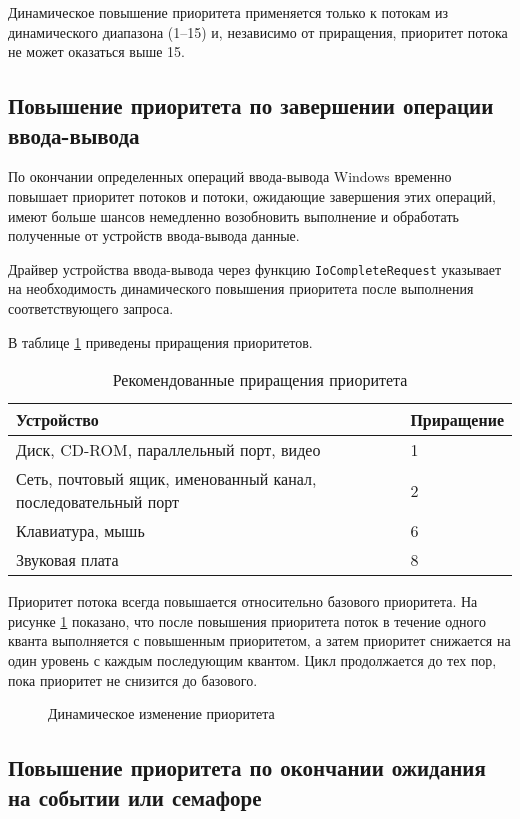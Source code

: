\documentclass[a4paper,oneside,14pt]{extreport}
\newcommand{\img}[3]
{
	\begin{figure}[ht]
	\center{\texttt{[image: images/\#2]}}
	\caption{#3}
	\label{img:#2}
	\end{figure}
}
\newcommand{\code}[1]{\texttt{#1}}
\begin{document}
Динамическое повышение приоритета применяется только к потокам из динамического диапазона (1--15) и, независимо от приращения, приоритет потока не может оказаться выше 15.

\subsection{Повышение приоритета по завершении операции ввода-вывода}

По окончании определенных операций ввода-вывода Windows временно повышает приоритет потоков и потоки, ожидающие завершения этих операций, имеют больше шансов немедленно возобновить выполнение и обработать полученные от устройств ввода-вывода данные.

Драйвер устройства ввода-вывода через функцию \code{IoCompleteRequest} указывает на необходимость динамического повышения приоритета после выполнения соответствующего запроса.

В таблице \ref{tbl:priorityinc} приведены приращения приоритетов.

\begin{table}
\begin{center}
\begin{tabular}{|p{100mm}|l|} 
	\hline
	Устройство & Приращение \\	
	\hline
	Диск, CD-ROM, параллельный порт, видео & 1 \\
	\hline
	Сеть, почтовый ящик, именованный канал, последовательный порт & 2 \\
	\hline
	Клавиатура, мышь & 6 \\
	\hline
	Звуковая плата & 8 \\
	\hline
\end{tabular}
\end{center}
\caption{Рекомендованные приращения приоритета}
\label{tbl:priorityinc}
\end{table}

Приоритет потока всегда повышается относительно базового приоритета. На рисунке \ref{img:priority} показано, что после повышения приоритета поток в течение одного кванта выполняется с повышенным приоритетом, а затем приоритет снижается на один уровень с каждым последующим квантом. Цикл продолжается до тех пор, пока приоритет не снизится до базового.

\img{0.95\textwidth}{priority}{Динамическое изменение приоритета}

\subsection{Повышение приоритета по окончании ожидания на событии или семафоре}
\end{document}
